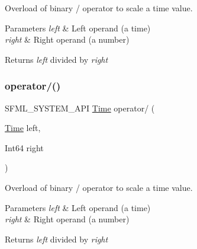 Overload of binary / operator to scale a time value. 


\begin{DoxyParams}{Parameters}
{\em left} & Left operand (a time) \\
\hline
{\em right} & Right operand (a number)\\
\hline
\end{DoxyParams}
\begin{DoxyReturn}{Returns}
{\itshape left} divided by {\itshape right} \begin{DoxyVerb}\end{DoxyVerb}
 
\end{DoxyReturn}
\mbox{\label{classsf_1_1_time_ab72f2de3e2bb592b4b4008dc1ac79056}} 
\subsubsection{\texorpdfstring{operator/()}{operator/()}\hspace{0.1cm}{\footnotesize\ttfamily [2/3]}}
{\footnotesize\ttfamily S\+F\+M\+L\+\_\+\+S\+Y\+S\+T\+E\+M\+\_\+\+A\+PI \mbox{\hyperlink{classsf_1_1_time}{Time}} operator/ (\begin{DoxyParamCaption}\item[{\mbox{\hyperlink{classsf_1_1_time}{Time}}}]{left,  }\item[{Int64}]{right }\end{DoxyParamCaption})\hspace{0.3cm}{\ttfamily [related]}}



Overload of binary / operator to scale a time value. 


\begin{DoxyParams}{Parameters}
{\em left} & Left operand (a time) \\
\hline
{\em right} & Right operand (a number)\\
\hline
\end{DoxyParams}
\begin{DoxyReturn}{Returns}
{\itshape left} divided by {\itshape right} \begin{DoxyVerb}\end{DoxyVerb}
 
\end{DoxyReturn}
\mbox{\label{classsf_1_1_time_ac3ae4f4d24a93e088d8e36d68322ea0f}} 
